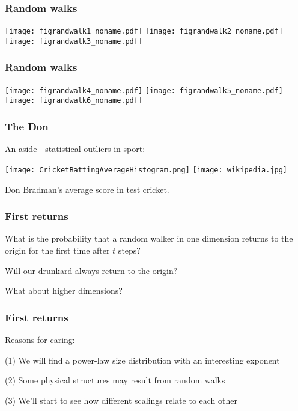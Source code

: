 \begin{frame}
  \frametitle{Random walks}

\texttt{[image: figrandwalk1\_noname.pdf]}
\texttt{[image: figrandwalk2\_noname.pdf]}
\texttt{[image: figrandwalk3\_noname.pdf]}

\end{frame}

\begin{frame}
  \frametitle{Random walks}

\texttt{[image: figrandwalk4\_noname.pdf]}
\texttt{[image: figrandwalk5\_noname.pdf]}
\texttt{[image: figrandwalk6\_noname.pdf]}


\end{frame}

\begin{frame}
  \frametitle{The Don}

  An aside---statistical outliers in sport:

  \begin{center}
    \texttt{[image: CricketBattingAverageHistogram.png]}
    \texttt{[image: wikipedia.jpg]}
  \end{center}

  Don Bradman's average score in test cricket.

\end{frame}

\begin{frame}
  \frametitle{First returns}

  What is the probability that a random walker
  in one dimension returns to the origin
  for the first time after $t$ steps?

  Will our drunkard always return to the origin?

  What about higher dimensions?

\end{frame}

\begin{frame}
  \frametitle{First returns}

  Reasons for caring:

  (1) We will find a power-law size distribution
  with an interesting exponent

  (2) Some physical structures may result from random walks

  (3) We'll start to see how different scalings relate to each other

\end{frame}

